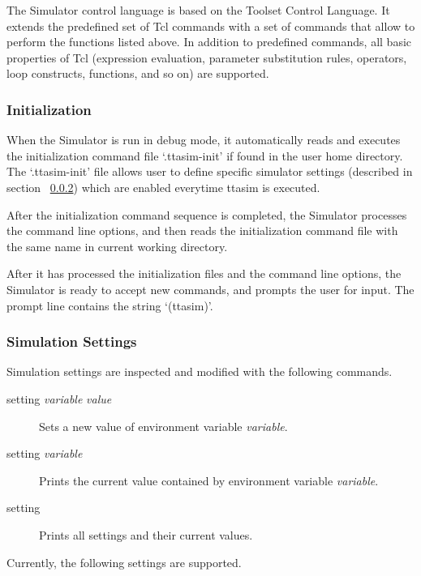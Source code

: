 \documentclass[twoside]{tceusermanual}
\begin{document}
The Simulator control language is based on the Toolset Control
Language.  It extends the predefined set of Tcl commands
with a set of commands that allow to perform the functions listed above.  In
addition to predefined commands, all basic properties of Tcl (expression
evaluation, parameter substitution rules, operators, loop constructs,
functions, and so on) are supported.

\subsubsection{Initialization}

When the Simulator is run in debug mode, it automatically reads and executes
the initialization command file `.ttasim-init' if found in the user home
directory. The `.ttasim-init' file allows user to define specific simulator
settings (described in section ~\ref{ssec:debug-set}) which are enabled
everytime ttasim is executed.

After the initialization command sequence is completed, the
Simulator processes the command line options, and then reads the
initialization command file with the same name in current working directory.

After it has processed the initialization files and the command line options,
the Simulator is ready to accept new commands, and prompts the user for
input. The prompt line contains the string `(ttasim)'.

\subsubsection{Simulation Settings}
\label{ssec:debug-set}

Simulation settings are inspected and modified with the following commands.

\begin{description}
\item[setting \emph{variable} \emph{value}] %
  Sets a new value of environment variable \emph{variable}.
\item[setting \emph{variable}] %
  Prints the current value contained by environment variable
  \emph{variable}.
\item[setting] %
  Prints all settings and their current values. 
\end{description}

Currently, the following settings are supported.
\end{document}
